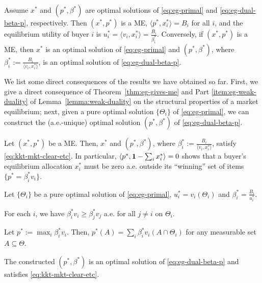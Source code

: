 \begin{theorem}
	Assume $x^*$ and $(p^*, \beta^*)$ are optimal solutions of \eqref{eq:eg-primal} and \eqref{eq:eg-dual-beta-p}, respectively. 
	Then $(x^*, p^*)$ is a ME, $\langle p^*, x^*_i \rangle = B_i$ for all $i$, and the equilibrium utility of buyer $i$ is $u^*_i = \langle v_i, x^*_i \rangle = \frac{B_i}{\beta^*_i}$. 
	Conversely, if $(x^*, p^*)$ is a ME, then $x^*$ is an optimal solution of \eqref{eq:eg-primal} and $(p^*, \beta^*)$, where $\beta^*_i := \frac{B_i}{\langle v_i, x^*_i\rangle}$, is an optimal solution of \eqref{eq:eg-dual-beta-p}.
	\label{thm:eg-gives-me}
\end{theorem}
We list some direct consequences of the results we have obtained so far. First, we give a direct consequence of Theorem~\ref{thm:eg-gives-me} and Part \ref{item:eg-weak-duality} of Lemma~\ref{lemma:weak-duality} on the structural properties of a market equilibrium; next, given a pure optimal solution $\{\Theta_i\}$ of \eqref{eq:eg-primal}, we can construct the (a.e.-unique) optimal solution $(p^*, \beta^*)$ of \eqref{eq:eg-dual-beta-p}.
\begin{corollary}
	Let $(x^*, p^*)$ be a ME. 
	Then, $x^*$ and $(p^*, \beta^*)$, where $\beta^*_i := \frac{B_i}{\langle v_i, x^*_i\rangle}$, satisfy \eqref{eq:kkt-mkt-clear-etc}. In particular, $\langle p^*, \mathbf{1} - \sum_i x^*_i \rangle = 0$ shows that a buyer's equilibrium allocation $x^*_i$ must be zero a.e. outside its ``winning'' set of items $\{p^* = \beta^*_i v_i \}$.
	\label{cor:me-structiral-properties}
\end{corollary}
\begin{corollary}
	Let $\{\Theta_i\}$ be a pure optimal solution of \eqref{eq:eg-primal}, $u^*_i = v_i(\Theta_i)$ and $\beta^*_i = \frac{B_i}{u^*_i}$.
	\begin{enumerate*}[label=(\alph*)]
		\item For each $i$, we have $\beta^*_i v_i \geq \beta^*_j v_j$ a.e. for all $j\neq i$ on $\Theta_i$. \label{item:thm-eg-pure-solution-gives-dual-feas}
		\item Let $p^* := \max_i \beta^*_i v_i$. Then, $p^*(A) = \sum_i \beta^*_i v_i(A\cap \Theta_i)$ for any measurable set $A\subseteq \Theta$.
		\label{item:thm-eg-pure-solution-gives-p*}
		\item The constructed $(p^*, \beta^*)$ is an optimal solution of \eqref{eq:eg-dual-beta-p} and satisfies \eqref{eq:kkt-mkt-clear-etc}. 
		\label{item:thm-eg-pure-solution-gives-dual-opt}
	\end{enumerate*}
	 \label{cor:eg-pure-solution-gives-strong-duality}
\end{corollary}
